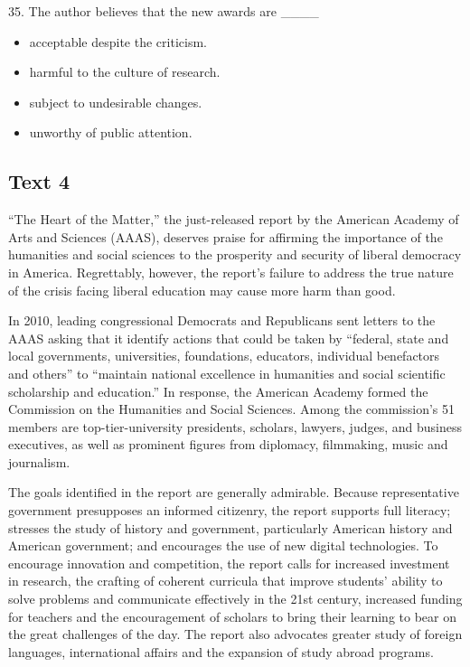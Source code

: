 \documentclass[UTF8,11pt]{ctexart}
\begin{document}
35. The author believes that the new awards are \_\_\_\_


\begin{itemize}[leftmargin=2em,itemsep=.2em,topsep=.4em]\item[A.] acceptable despite the criticism.
\item[B.] harmful to the culture of research.
\item[C.] subject to undesirable changes.
\item[D.] unworthy of public attention.
\end{itemize}

\subsection*{\textbf{Text 4}}


“The Heart of the Matter,” the just-released report by the American Academy of Arts and Sciences (AAAS), deserves praise for affirming the importance of the humanities and social sciences to the prosperity and security of liberal democracy in America. Regrettably, however, the report’s failure to address the true nature of the crisis facing liberal education may cause more harm than good.


In 2010, leading congressional Democrats and Republicans sent letters to the AAAS asking that it identify actions that could be taken by “federal, state and local governments, universities, foundations, educators, individual benefactors and others” to “maintain national excellence in humanities and social scientific scholarship and education.” In response, the American Academy formed the Commission on the Humanities and Social Sciences. Among the commission’s 51 members are top-tier-university presidents, scholars, lawyers, judges, and business executives, as well as prominent figures from diplomacy, filmmaking, music and journalism.


The goals identified in the report are generally admirable. Because representative government presupposes an informed citizenry, the report supports full literacy; stresses the study of history and government, particularly American history and American government; and encourages the use of new digital technologies. To encourage innovation and competition, the report calls for increased investment in research, the crafting of coherent curricula that improve students’ ability to solve problems and communicate effectively in the 21st century, increased funding for teachers and the encouragement of scholars to bring their learning to bear on the great challenges of the day. The report also advocates greater study of foreign languages, international affairs and the expansion of study abroad programs.
\end{document}
